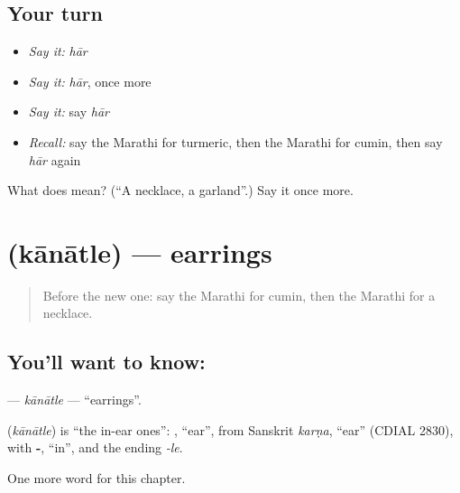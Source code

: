 \subsection*{Your turn}
\begin{itemize}
\raggedright
  \item \emph{Say it:} \emph{hār}
  \item \emph{Say it:} \emph{hār}, once more
  \item \emph{Say it:} say \emph{hār}
  \item \emph{Recall:} say the Marathi for turmeric, then the Marathi for cumin, then say \emph{hār} again
\end{itemize}

\begin{tcolorbox}[breakable,colback=teal!4,colframe=teal!35!black,title={Before you move on}]
What does  mean? (\textquotedblleft{}A necklace, a garland\textquotedblright{}.) Say it once more.
\end{tcolorbox}
\section[\texorpdfstring{\mr{कानातले} (kānātle)}{कानातले (kānātle)}]{ (kānātle) — earrings}

\label{lesson:MR-C217-kanatle}



\begin{quote}
Before the new one: say the Marathi for cumin, then the Marathi for a necklace.
\end{quote}

\subsection*{You'll want to know: }
\textbf{} — \emph{kānātle} — \textquotedblleft{}earrings\textquotedblright{}.

\begin{cousinweb}
\textbf{} (\emph{kānātle}) is \textquotedblleft{}the in-ear ones\textquotedblright{}: \textbf{}, \textquotedblleft{}ear\textquotedblright{}, from Sanskrit \emph{karṇa}, \textquotedblleft{}ear\textquotedblright{} (CDIAL 2830), with \textbf{-}, \textquotedblleft{}in\textquotedblright{}, and the ending \emph{-le}.
\end{cousinweb}

\begin{grammarlens}[title={What you've built}]
One more word for this chapter.
\end{grammarlens}

